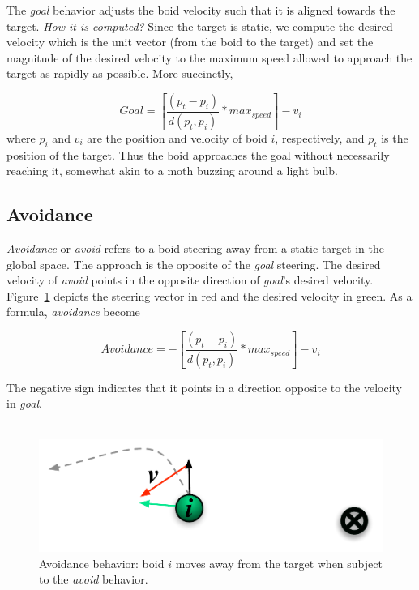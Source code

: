 The \textit{goal} behavior adjusts the boid velocity such that it is aligned towards the target. \textit{How it is computed?} Since the target is static, we compute the desired velocity which is the unit vector (from the boid to the target) and set the magnitude of the desired velocity to the maximum speed allowed to approach the target as rapidly as possible. 
More succinctly, 

\begin{equation}
\label{goalEquation}
Goal = \left[\frac{(p_t - p_i)}{d(p_t,p_i)} * max_{speed} \right] - v_i
\end{equation}
where $p_i$ and $v_i$ are the position and velocity of boid $i$, respectively, and $p_t$ is the position of the target. Thus the boid approaches the goal without necessarily reaching it, somewhat akin to a moth buzzing around a light bulb.

\subsection{Avoidance}
\textit{Avoidance} or \textit{avoid} refers to a boid steering away from a static target in the global space. The approach is the opposite of the \textit{goal} steering. The desired velocity of \textit{avoid} points in the opposite direction of \textit{goal}'s desired velocity. Figure~\ref{avoidPDF} depicts the steering vector in red and the desired velocity in green. As a formula, 
\textit{avoidance} become

\begin{equation}
\label{avoidEquation}
Avoidance = -\left[\frac{(p_t - p_i)}{d(p_t,p_i)} * max_{speed} \right] - v_i
\end{equation}

The negative sign indicates that it points in a direction opposite to the velocity in \textit{goal}. \\ \\ 

\begin{figure}[htbp]
\vspace{16pt}
\begin{center}
\includegraphics[scale=0.95]{figures/avoidance.pdf}
\caption{Avoidance behavior: boid $i$ moves away from the target when subject to the \textit{avoid} behavior.}
\label{avoidPDF}
\end{center}
\end{figure}

